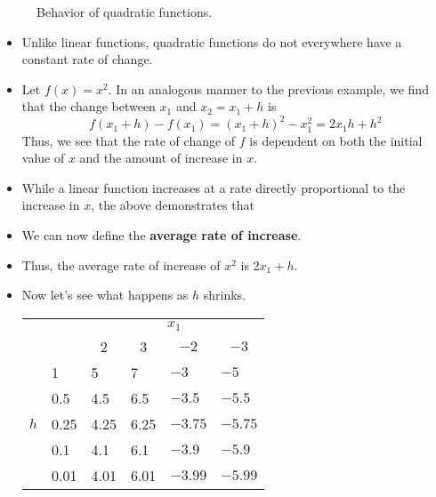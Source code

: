 \documentclass[../main.tex]{subfiles}
\begin{document}
\begin{itemize}
\begin{figure}[h!]
        \caption{Behavior of quadratic functions.}
        \label{fig:behavior-quadratic}
    \end{figure}
    \begin{itemize}
        \item Unlike linear functions, quadratic functions do not everywhere have a constant rate of change.
        \item Let $f(x)=x^2$. In an analogous manner to the previous example, we find that the change between $x_1$ and $x_2=x_1+h$ is
        \begin{equation*}
            f(x_1+h)-f(x_1) = (x_1+h)^2-x_1^2
            = 2x_1h+h^2
        \end{equation*}
        Thus, we see that the rate of change of $f$ is dependent on both the initial value of $x$ and the amount of increase in $x$.
        \item While a linear function increases at a rate directly proportional to the increase in $x$, the above demonstrates that 
        \item We can now define the \textbf{average rate of increase}.
        \item Thus, the average rate of increase of $x^2$ is $2x_1+h$.
        \item Now let's see what happens as $h$ shrinks.
        \begin{table}[h!]
            \centering
            \setlength{\tabcolsep}{4mm}
            \begin{tabular}{r|l|l|l|l|l}
                \multicolumn{2}{c|}{\multirow{2}{*}{}} & \multicolumn{4}{c}{\rule[-0.2cm]{0pt}{0.6cm} $x_1$}\\
                \cline{3-6}
                 \multicolumn{2}{c|}{} & \multicolumn{1}{c|}{\rule[-0.2cm]{0pt}{0.6cm} 2} & \multicolumn{1}{c|}{3} & \multicolumn{1}{c|}{$-2$} & \multicolumn{1}{c}{$-3$}\\
                \hline
                \multirow{6}{*}{$h$} & 1 & 5 & 7 & $-3$ & $-5$\\
                 & 0.5 & 4.5 & 6.5 & $-3.5$ & $-5.5$\\
                 & 0.25 & 4.25 & 6.25 & $-3.75$ & $-5.75$\\
                 & 0.1 & 4.1 & 6.1 & $-3.9$ & $-5.9$\\
                 & 0.01 & 4.01 & 6.01 & $-3.99$ & $-5.99$\\

\end{tabular}
\end{table}
\end{itemize}
\end{itemize}
\end{document}
